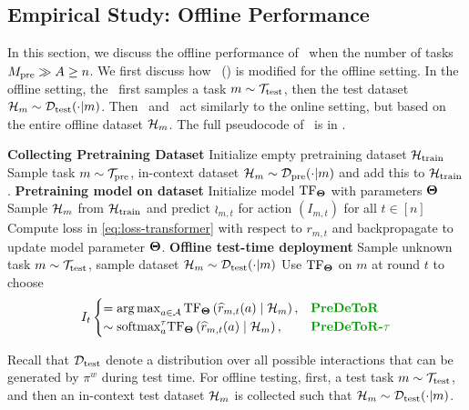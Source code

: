 \documentclass[10pt]{article}
\theoremstyle{plain}
\theoremstyle{definition}
\theoremstyle{remark}
\begin{document}
\subsection{Empirical Study: Offline Performance}
\label{sec:offline}
In this section, we discuss the offline performance of \pred\ when the number of tasks $M_{\text{pre}} \gg A \geq n$.
We first discuss how \pred\ (\gt) is modified for the offline setting.
In the offline setting, the \pred\ first samples a task $m\sim\mathcal{T}_{\text{test}}$, then the test dataset $\mathcal{H}_m\sim \mathcal{D}_{\text{test}}(\cdot|m)$. Then \pred\ and \predt\ act similarly to the online setting, but based on the entire offline dataset $\mathcal{H}_m$.
The full pseudocode of \pred\ is in .
\begin{algorithm}[!tbh]
\caption{\textbf{Pre}-trained \textbf{De}cision \textbf{T}ransf\textbf{o}rmer with \textbf{R}eward Estimation (\pred)}
\label{alg:pred-off}
    \begin{algorithmic}[1]
    \STATE \textbf{Collecting Pretraining Dataset}
    \STATE Initialize empty pretraining dataset $\mathcal{H}_{\text{train}}$
    \STATE Sample task $m \sim \mathcal{T}_{\text{pre}}$, in-context dataset $\mathcal{H}_m \sim \mathcal{D}_{\text{pre}}(\cdot | m)$ and add this to $\mathcal{H}_{\text{train}}$.
    \ENDFOR
    \STATE \textbf{Pretraining model on dataset}
    \STATE Initialize model $\mathrm{TF}_{\mathbf{\Theta}}$ with parameters $\mathbf{\Theta}$
    \STATE Sample $\mathcal{H}_m$ from $\mathcal{H}_{\text{train}}$ and predict $\wr_{m,t}$ for action $(I_{m,t})$ for all $t \in[n]$
    \STATE Compute loss in \eqref{eq:loss-transformer} with respect to $r_{m,t}$ and backpropagate to update model parameter $\mathbf{\Theta}$.
    \ENDWHILE
    \STATE \textbf{Offline test-time deployment}
    \STATE Sample unknown task $m \sim \mathcal{T}_{\text{test}}$, sample dataset $\mathcal{H}_m \sim \mathcal{D}_{\text{test}}(\cdot | m)$
    \STATE Use $\mathrm{TF}_{\mathbf{\Theta}}$ on $m$ at round $t$ to choose
    \begin{align*}
        I_t \begin{cases}
            = \argmax_{a\in\A} \T_{\bTheta}\left( \wr_{m,t}(a) \mid \H_m\right), & \textbf{\pred} \\
            \sim \textrm{softmax}^\tau_a \T_{\bTheta}\left( \wr_{m,t}(a) \mid \H_m\right), & \textbf{\predt}
        \end{cases}
    \end{align*}
    \end{algorithmic}
\end{algorithm}
Recall that $\mathcal{D}_{\text{test}}$ denote a distribution over all possible interactions that can be generated by $\pi^w$ during test time.
For offline testing, first, a test task $m\sim\mathcal{T}_{\text{test}}$, and then an in-context test dataset $\mathcal{H}_m$ is collected such that $\mathcal{H}_m\sim\mathcal{D}_{\text{test}}(\cdot|m)$.
\end{document}
